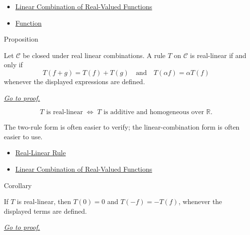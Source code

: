\begin{dependencies}
\begin{itemize}
  \item \hyperref[def:linear-combination-of-real-valued-functions]{Linear Combination of Real-Valued Functions}
  \item \hyperref[def:function]{Function}
\end{itemize}
\end{dependencies}

\begin{propositionbox}{Proposition}
\begin{proposition}
\label{prop:real-linear-rule-test}
Let \(\mathcal{C}\) be closed under real linear combinations.  A rule
\(T\) on \(\mathcal{C}\) is real-linear if and only if
\[
  T(f+g)=T(f)+T(g)
  \quad\text{and}\quad
  T(\alpha f)=\alpha T(f)
\]
whenever the displayed expressions are defined.

\smallskip\noindent
\hyperref[prf:real-linear-rule-test]{\textit{Go to proof.}}
\end{proposition}
\end{propositionbox}

\begin{remark*}
\[
  T\text{ is real-linear}
  \;\Longleftrightarrow\;
  T\text{ is additive and homogeneous over }\mathbb{R}.
\]
\end{remark*}

\begin{remark*}[Interpretation]
The two-rule form is often easier to verify; the linear-combination form is
often easier to use.
\end{remark*}

\begin{dependencies}
\begin{itemize}
  \item \hyperref[def:real-linear-rule]{Real-Linear Rule}
  \item \hyperref[def:linear-combination-of-real-valued-functions]{Linear Combination of Real-Valued Functions}
\end{itemize}
\end{dependencies}

\begin{corollarybox}{Corollary}
\begin{corollary}
\label{cor:real-linear-rule-basic-values}
If \(T\) is real-linear, then \(T(0)=0\) and \(T(-f)=-T(f)\), whenever
the displayed terms are defined.

\smallskip\noindent
\hyperref[prf:real-linear-rule-basic-values]{\textit{Go to proof.}}
\end{corollary}
\end{corollarybox}

